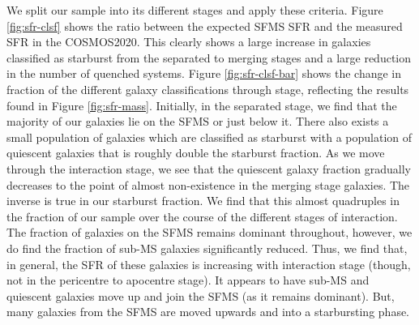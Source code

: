 \noindent We split our sample into its different stages and apply these criteria. Figure \ref{fig:sfr-clsf} shows the ratio between the expected SFMS SFR and the measured SFR in the COSMOS2020. This clearly shows a large increase in galaxies classified as starburst from the separated to merging stages and a large reduction in the number of quenched systems. Figure \ref{fig:sfr-clsf-bar} shows the change in fraction of the different galaxy classifications through stage, reflecting the results found in Figure \ref{fig:sfr-mass}. Initially, in the separated stage, we find that the majority of our galaxies lie on the SFMS or just below it. There also exists a small population of galaxies which are classified as starburst with a population of quiescent galaxies that is roughly double the starburst fraction. As we move through the interaction stage, we see that the quiescent galaxy fraction gradually decreases to the point of almost non-existence in the merging stage galaxies. The inverse is true in our starburst fraction. We find that this almost quadruples in the fraction of our sample over the course of the different stages of interaction. The fraction of galaxies on the SFMS remains dominant throughout, however, we do find the fraction of sub-MS galaxies significantly reduced. Thus, we find that, in general, the SFR of these galaxies is increasing with interaction stage (though, not in the pericentre to apocentre stage). It appears to have sub-MS and quiescent galaxies move up and join the SFMS (as it remains dominant). But, many galaxies from the SFMS are moved upwards and into a starbursting phase.


